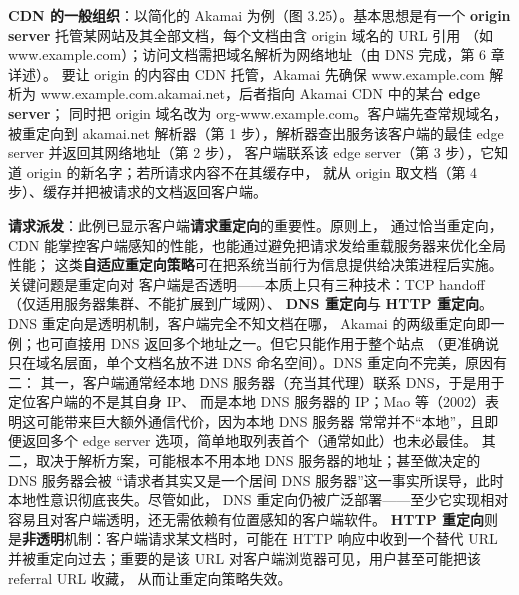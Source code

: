 \medskip\noindent\textbf{CDN 的一般组织}：以简化的 Akamai 为例（图 3.25）。基本思想是有一个
\textbf{origin server} 托管某网站及其全部文档，每个文档由含 origin 域名的 URL 引用
（如 www.example.com）；访问文档需把域名解析为网络地址（由 DNS 完成，第 6 章详述）。
要让 origin 的内容由 CDN 托管，Akamai 先确保 www.example.com 解析为
www.example.com.akamai.net，后者指向 Akamai CDN 中的某台 \textbf{edge server}；
同时把 origin 域名改为 org-www.example.com。客户端先查常规域名，被重定向到 akamai.net
解析器（第 1 步），解析器查出服务该客户端的最佳 edge server 并返回其网络地址（第 2 步），
客户端联系该 edge server（第 3 步），它知道 origin 的新名字；若所请求内容不在其缓存中，
就从 origin 取文档（第 4 步）、缓存并把被请求的文档返回客户端。

\medskip\noindent\textbf{请求派发}：此例已显示客户端\textbf{请求重定向}的重要性。原则上，
通过恰当重定向，CDN 能掌控客户端感知的性能，也能通过避免把请求发给重载服务器来优化全局性能；
这类\textbf{自适应重定向策略}可在把系统当前行为信息提供给决策进程后实施。关键问题是重定向对
客户端是否透明——本质上只有三种技术：TCP handoff（仅适用服务器集群、不能扩展到广域网）、
\textbf{DNS 重定向}与 \textbf{HTTP 重定向}。DNS 重定向是透明机制，客户端完全不知文档在哪，
Akamai 的两级重定向即一例；也可直接用 DNS 返回多个地址之一。但它只能作用于整个站点
（更准确说只在域名层面，单个文档名放不进 DNS 命名空间）。DNS 重定向不完美，原因有二：
其一，客户端通常经本地 DNS 服务器（充当其代理）联系 DNS，于是用于定位客户端的不是其自身 IP、
而是本地 DNS 服务器的 IP；Mao 等（2002）表明这可能带来巨大额外通信代价，因为本地 DNS 服务器
常常并不“本地”，且即便返回多个 edge server 选项，简单地取列表首个（通常如此）也未必最佳。
其二，取决于解析方案，可能根本不用本地 DNS 服务器的地址；甚至做决定的 DNS 服务器会被
“请求者其实又是一个居间 DNS 服务器”这一事实所误导，此时本地性意识彻底丧失。尽管如此，
DNS 重定向仍被广泛部署——至少它实现相对容易且对客户端透明，还无需依赖有位置感知的客户端软件。
\textbf{HTTP 重定向}则是\textbf{非透明}机制：客户端请求某文档时，可能在 HTTP 响应中收到一个替代
URL 并被重定向过去；重要的是该 URL 对客户端浏览器可见，用户甚至可能把该 referral URL 收藏，
从而让重定向策略失效。

\begin{closeread}
\end{closeread}

